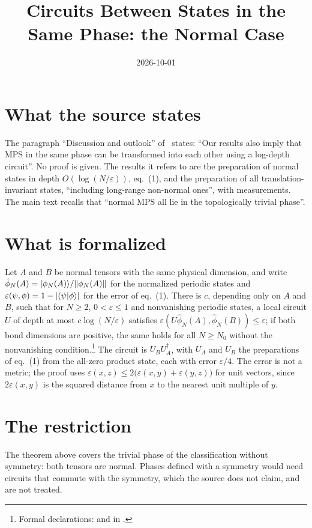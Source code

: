 \documentclass{article}
\title{Circuits Between States in the Same Phase: the Normal Case}
\author{}
\date{2026-10-01}
\begin{document}
\maketitle
{}

\section{What the source states}
The paragraph ``Discussion and outlook'' of~\cite{Malz2024Preparation} states:
``Our results also imply that MPS in the same phase can be transformed into
each other using a log-depth circuit''. No proof is given. The results it
refers to are the preparation of normal states in depth
$O(\log(N/\varepsilon))$, eq.~(1), and the preparation of all
translation-invariant states, ``including long-range non-normal ones'', with
measurements. The main text recalls that ``normal MPS all lie in the
topologically trivial phase''.

\section{What is formalized}
Let $A$ and $B$ be normal tensors with the same physical dimension, and
write $\hat\phi_N(A)=|\phi_N(A)\rangle/\lVert\phi_N(A)\rVert$ for the normalized periodic
states and
$\varepsilon(\psi,\phi)=1-\lvert\langle \psi | \phi \rangle\rvert$ for the error of
eq.~(1). There is $c$, depending only on $A$ and $B$, such that for $N\ge2$,
$0<\varepsilon\le1$ and nonvanishing periodic states, a local circuit $U$ of
depth at most $c\log(N/\varepsilon)$ satisfies
$\varepsilon(U\hat\phi_N(A),\hat\phi_N(B))\le\varepsilon$; if both bond dimensions are
positive, the same holds for all $N\ge N_0$ without the nonvanishing
condition.\footnote{Formal declarations:
    and  in
    .}
The circuit is $U_BU_A^\dagger$, with $U_A$ and $U_B$ the preparations of
eq.~(1) from the all-zero product state, each with error $\varepsilon/4$. The
error is not a metric; the proof uses
$\varepsilon(x,z)\le2\bigl(\varepsilon(x,y)+\varepsilon(y,z)\bigr)$ for unit
vectors, since $2\varepsilon(x,y)$ is the squared distance from $x$ to the
nearest unit multiple of $y$.

\section{The restriction}
The theorem above covers the trivial phase of the classification without
symmetry: both tensors are normal. Phases defined with a symmetry would need
circuits that commute with the symmetry, which the source does not claim, and
are not treated.
\end{document}

